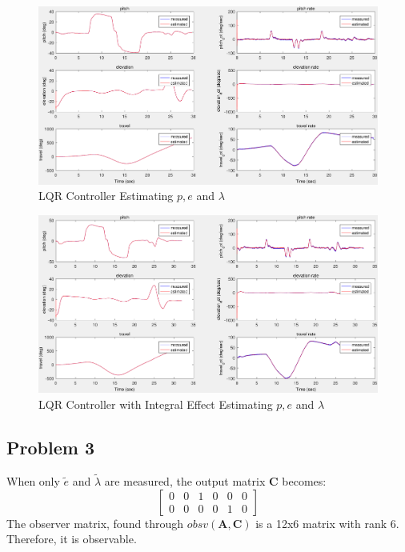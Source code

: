 \begin{figure}[p]
\caption{LQR Controller Estimating $p, e$ and $\lambda$}
	\begin{center}
		\includegraphics[angle = 90, width = \textwidth]{images/542_LQR_Estimator.pdf}
	\end{center}
	\label{fig:LQR_Estimator}
\end{figure}

\begin{figure}[p]
\caption{LQR Controller with Integral Effect Estimating $p, e$ and $\lambda$}
	\begin{center}
		\includegraphics[angle = 90, width = \textwidth]{images/542_LQRIntegralEffect_Estimator.pdf}
	\end{center}
	\label{fig:LQRIntegralEffect_Estimator}
\end{figure}

\subsection{Problem 3}
When only $\tilde{e}$ and $\tilde{\lambda}$ are measured, the output
matrix $\bm{C}$ becomes:
%
\begin{equation*}
  \begin{bmatrix}
    0 & 0 & 1 & 0 & 0 & 0 \\
    0 & 0 & 0 & 0 & 1 & 0
  \end{bmatrix}
\end{equation*}
%
The observer matrix, found through $obsv(\bm{A},\bm{C})$ is a 12x6
matrix with rank 6. Therefore, it is observable.

